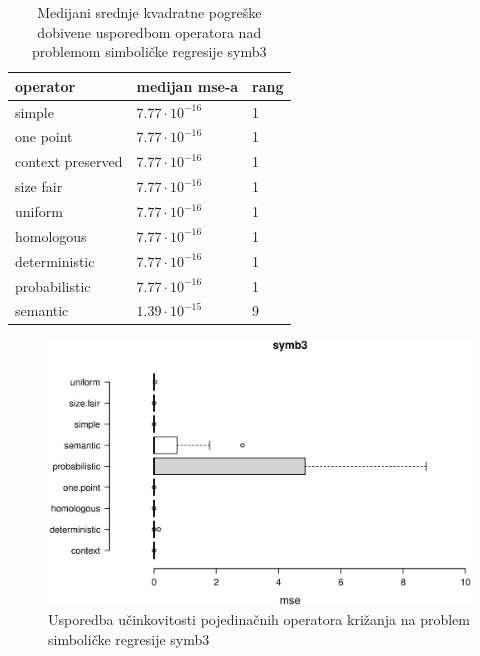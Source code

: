 \begin{table}[H]
 	\centering

    \caption{Medijani srednje kvadratne pogreške dobivene usporedbom operatora nad problemom simboličke regresije symb3}
    \begin{tabular}{| l | l | l |}
    \hline
    \textbf{operator} & \textbf{medijan mse-a} & \textbf{rang}\\ \hline
    simple & $7.77 \cdot 10^{-16}$ & 1\\ \hline
    one point & $7.77 \cdot 10^{-16}$ & 1\\ \hline
    context preserved &$7.77 \cdot 10^{-16}$& 1 \\ \hline
    size fair & $7.77 \cdot 10^{-16}$ & 1\\ \hline
    uniform & $7.77 \cdot 10^{-16}$ & 1\\ \hline
    homologous & $7.77 \cdot 10^{-16}$ & 1\\ \hline
    deterministic & $7.77 \cdot 10^{-16}$ & 1\\ \hline
    probabilistic & $7.77 \cdot 10^{-16}$ & 1\\ \hline
    semantic & $1.39 \cdot 10^{-15}$ & 9\\ \hline
    \end{tabular}
    
    \label{symb3table}
\end{table}

\begin{figure}[H]
	\centering
	\includegraphics[trim=0cm 4cm 0cm 0cm, scale=0.6]{./slike/boxPlots/symb3.eps}
	\caption{Usporedba učinkovitosti pojedinačnih operatora križanja na problem simboličke regresije symb3}
	\label{symb3box}
\end{figure}

